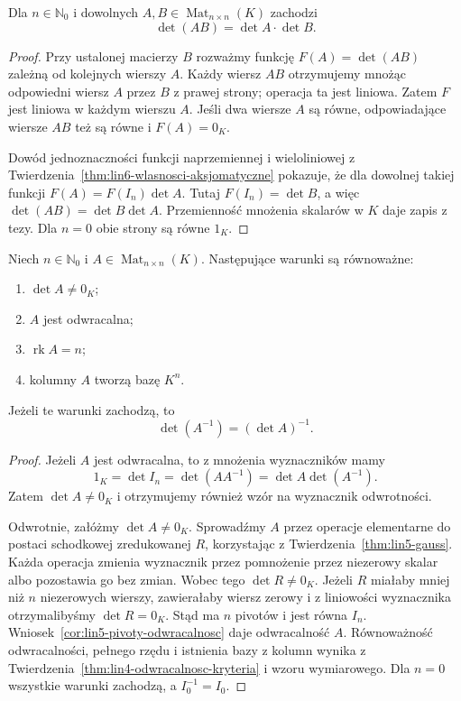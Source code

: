 \begin{twierdzenie}
\label{thm:lin6-multiplikatywnosc}
Dla \(n\in\mathbb N_0\) i dowolnych
\(A,B\in\operatorname{Mat}_{n\times n}(K)\)
zachodzi
\[
 \det(AB)=\det A\cdot\det B.
\]
\end{twierdzenie}
\begin{proof}
Przy ustalonej macierzy \(B\)
rozważmy funkcję
\(F(A)=\det(AB)\) zależną od
kolejnych wierszy \(A\).
Każdy wiersz \(AB\) otrzymujemy
mnożąc odpowiedni wiersz \(A\)
przez \(B\) z prawej strony;
operacja ta jest liniowa.
Zatem \(F\) jest liniowa w każdym
wierszu \(A\). Jeśli dwa wiersze \(A\)
są równe, odpowiadające wiersze \(AB\)
też są równe i \(F(A)=0_K\).

Dowód jednoznaczności funkcji
naprzemiennej i wieloliniowej z
Twierdzenia~\ref{thm:lin6-wlasnosci-aksjomatyczne}
pokazuje, że dla dowolnej takiej funkcji
\(F(A)=F(I_n)\det A\).
Tutaj \(F(I_n)=\det B\), a więc
\(\det(AB)=\det B\det A\).
Przemienność mnożenia skalarów w \(K\)
daje zapis z tezy.
Dla \(n=0\) obie strony są równe \(1_K\).
\end{proof}

\begin{twierdzenie}
\label{thm:lin6-odwracalnosc}
Niech \(n\in\mathbb N_0\) i
\(A\in\operatorname{Mat}_{n\times n}(K)\).
Następujące warunki są równoważne:
\begin{enumerate}[label=(\roman*)]
\item \(\det A\ne0_K\);
\item \(A\) jest odwracalna;
\item \(\operatorname{rk}A=n\);
\item kolumny \(A\) tworzą bazę \(K^n\).
\end{enumerate}
Jeżeli te warunki zachodzą, to
\[
 \det(A^{-1})=(\det A)^{-1}.
\]
\end{twierdzenie}
\begin{proof}
Jeżeli \(A\) jest odwracalna,
to z mnożenia wyznaczników mamy
\[
 1_K=\det I_n
    =\det(AA^{-1})
    =\det A\det(A^{-1}).
\]
Zatem \(\det A\ne0_K\) i otrzymujemy
również wzór na wyznacznik odwrotności.

Odwrotnie, załóżmy \(\det A\ne0_K\).
Sprowadźmy \(A\) przez operacje
elementarne do postaci schodkowej
zredukowanej \(R\), korzystając z
Twierdzenia~\ref{thm:lin5-gauss}.
Każda operacja zmienia wyznacznik
przez pomnożenie przez niezerowy
skalar albo pozostawia go bez zmian.
Wobec tego \(\det R\ne0_K\).
Jeżeli \(R\) miałaby mniej niż \(n\)
niezerowych wierszy, zawierałaby
wiersz zerowy i z liniowości wyznacznika
otrzymalibyśmy \(\det R=0_K\).
Stąd ma \(n\) pivotów i jest równa \(I_n\).
Wniosek~\ref{cor:lin5-pivoty-odwracalnosc}
daje odwracalność \(A\).
Równoważność odwracalności,
pełnego rzędu i istnienia bazy z kolumn
wynika z
Twierdzenia~\ref{thm:lin4-odwracalnosc-kryteria}
i wzoru wymiarowego.
Dla \(n=0\) wszystkie warunki zachodzą,
a \(I_0^{-1}=I_0\).
\end{proof}

